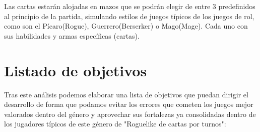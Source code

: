 Las cartas estarán alojadas en mazos que se podrán elegir de entre 3 predefinidos al principio de la partida, simulando estilos de juegos típicos de los juegos de rol, como son el Pícaro(Rogue), Guerrero(Berserker) o Mago(Mage). Cada uno con sus habilidades y armas específicas (cartas).





\section{Listado de objetivos}
Tras este análisis podemos elaborar una lista de objetivos que puedan dirigir el desarrollo de forma que podamos evitar los errores que cometen los juegos mejor valorados dentro del género y aprovechar sus fortalezas ya consolidadas dentro de los jugadores típicos de este género de "Roguelike de cartas por turnos": 
